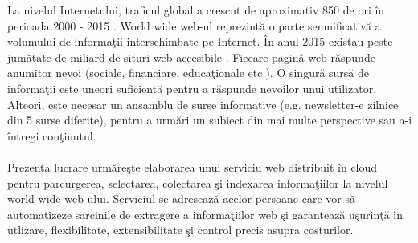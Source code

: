 La nivelul Internetului, traficul global a crescut de aproximativ 850 de ori în perioada 2000 - 2015 \cite{cisco-internet-traffic}. World wide web-ul reprezintă o parte semnificativă a volumului de informaţii interschimbate pe Internet. În anul 2015 existau peste jumătate de miliard de situri web accesibile \cite{http://www.internetlivestats.com/total-number-of-websites/}. Fiecare pagină web răspunde anumitor nevoi (sociale, financiare, educaţionale etc.). O singură sursă de informaţii este uneori suficientă pentru a răspunde nevoilor unui utilizator. Alteori, este necesar un ansamblu de surse informative (e.g. newsletter-e zilnice din 5 surse diferite), pentru a urmări un subiect din mai multe perspective sau a-i întregi conţinutul.
\\
\\
Prezenta lucrare urmăreşte elaborarea unui serviciu web distribuit în cloud pentru parcurgerea, selectarea, colectarea şi indexarea informaţiilor la nivelul world wide web-ului. Serviciul se adresează acelor persoane care vor să automatizeze sarcinile de extragere a informaţiilor web şi garantează uşurinţă în utlizare, flexibilitate, extensibilitate şi control precis asupra costurilor.
